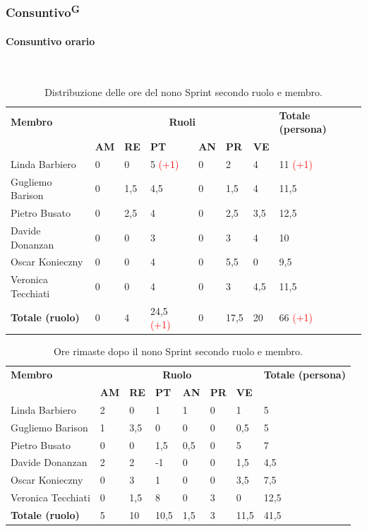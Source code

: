 \documentclass[8pt]{article}
\newcommand{\glossterm}[1]{#1\textsuperscript{G}} %
\newcommand{\subsubsubsection}[1]{\paragraph{#1}\mbox{}\\}
\begin{document}
\subsubsection{\glossterm{Consuntivo}}
\subsubsubsection{Consuntivo orario}
\begin{table}[ht!]
	\centering
	\begin{tabular}{p{4cm} *{6}{l} p{3cm}}
		\toprule
		\textbf{Membro} & \multicolumn{6}{c}{\textbf{Ruoli}} & \textbf{Totale
        (persona)}\\
		& \textbf{AM} & \textbf{RE} & \textbf{PT} & \textbf{AN} & \textbf{PR} & \textbf{VE}\\
		\midrule
        Linda Barbiero & 0 & 0 & 5 \textcolor{red}{(+1)} & 0 & 2 & 4 & 11 \textcolor{red}{(+1)} \\ 
        Gugliemo Barison & 0 & 1,5 & 4,5 & 0 & 1,5 & 4 & 11,5 \\ 
        Pietro Busato & 0 & 2,5 & 4 & 0 & 2,5 & 3,5 & 12,5 \\ 
        Davide Donanzan & 0 & 0 & 3 & 0 & 3 & 4 & 10 \\ 
        Oscar Konieczny & 0 & 0 & 4 & 0 & 5,5 & 0 & 9,5 \\ 
        Veronica Tecchiati & 0 & 0 & 4 & 0 & 3 & 4,5 & 11,5 \\ 
        \midrule
        \textbf{Totale (ruolo)} & 0 & 4 & 24,5 \textcolor{red}{(+1)} & 0 & 17,5 & 20 & 66 \textcolor{red}{(+1)} \\ 
		\bottomrule
	\end{tabular}
	\caption{Distribuzione delle ore del nono Sprint secondo ruolo e membro.}
	\label{table:Distribuzione delle ore del nono Sprint secondo ruolo e membro}
\end{table}
\begin{table}[ht!]
	\centering
	\begin{tabular}{p{4cm} p{1cm} p{1cm} p{1cm} p{1cm} p{1cm} p{1cm} p{3cm}}
		\toprule
        \textbf{Membro} & \multicolumn{6}{c}{\textbf{Ruolo}} & \textbf{Totale (persona)}\\
		& \textbf{AM} & \textbf{RE} & \textbf{PT} & \textbf{AN} & \textbf{PR} & \textbf{VE}\\
		\midrule
        Linda Barbiero & 2 & 0 & 1 & 1 & 0 & 1 & 5 \\ 
        Gugliemo Barison & 1 & 3,5 & 0 & 0 & 0 & 0,5 & 5 \\ 
        Pietro Busato & 0 & 0 & 1,5 & 0,5 & 0 & 5 & 7 \\ 
        Davide Donanzan & 2 & 2 & -1 & 0 & 0 & 1,5 & 4,5 \\ 
        Oscar Konieczny & 0 & 3 & 1 & 0 & 0 & 3,5 & 7,5 \\ 
        Veronica Tecchiati & 0 & 1,5 & 8 & 0 & 3 & 0 & 12,5 \\ 
        \midrule
        \textbf{Totale (ruolo)} & 5 & 10 & 10,5 & 1,5 & 3 & 11,5 & 41,5 \\
        \bottomrule
	\end{tabular}
	\caption{Ore rimaste dopo il nono Sprint secondo ruolo e membro.}
	\label{table:Ore rimaste dopo il nono Sprint secondo ruolo e membro}
\end{table}
\end{document}
